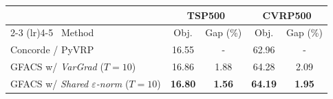 \begin{tabular}{lcccc}
\toprule[1.0pt]
\multicolumn{1}{c}{} & \multicolumn{2}{c}{TSP500} & \multicolumn{2}{c}{CVRP500}\\
\cmidrule(lr){2-3}
\cmidrule(lr){4-5}
\
Method & Obj. & Gap (\%) & Obj. & Gap (\%) \\
\midrule
Concorde / PyVRP & 16.55 & - & 62.96 & - \\
\midrule
GFACS w/ \textit{VarGrad} ($T=10$) & 16.86 & 1.88 & 64.28 & 2.09 \\
GFACS w/ \textit{Shared $\varepsilon$-norm} ($T=10$) & \textbf{16.80} & \textbf{1.56} & \textbf{64.19} & \textbf{1.95} \\
\bottomrule
\end{tabular}